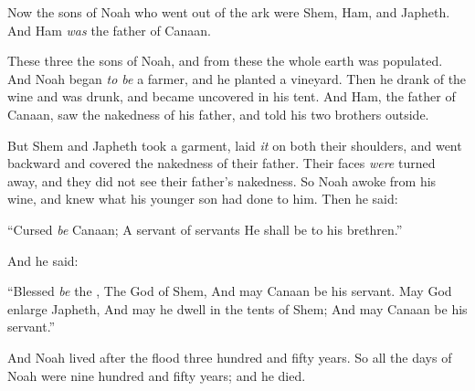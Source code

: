 
\bverse Now the sons of Noah who went out of the ark were Shem, Ham, and Japheth. And Ham \textit{was} the father of Canaan.

\bverse These three  the sons of Noah, and from these the whole earth was populated.
\bverse And Noah began \textit{to be} a farmer, and he planted a vineyard.
\bverse Then he drank of the wine and was drunk, and became uncovered in his tent.
\bverse And Ham, the father of Canaan, saw the nakedness of his father, and told his two brothers outside.

\bverse But Shem and Japheth took a garment, laid \textit{it} on both their shoulders, and went backward and covered the nakedness of their father. Their faces \textit{were} turned away, and they did not see their father's nakedness.
\bverse So Noah awoke from his wine, and knew what his younger son had done to him.
\bverse Then he said:
\begin{bquotation}
``Cursed \textit{be} Canaan; A servant of servants He shall be to his brethren.''
\end{bquotation}
\bverse And he said:
\begin{bquotation}
``Blessed \textit{be} the \lord, The God of Shem, And may Canaan be his servant.
\bverse May God enlarge Japheth, And may he dwell in the tents of Shem; And may Canaan be his servant.''
\end{bquotation}

\bverse And Noah lived after the flood three hundred and fifty years.
\bverse So all the days of Noah were nine hundred and fifty years; and he died.

